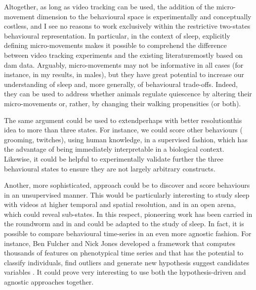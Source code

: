 Altogether, as long as video tracking can be used, the addition of the micro-movement dimension to the behavioural space is experimentally and conceptually costless, and I see no reasons to work exclusively within the restrictive two-states behavioural representation.
In particular, in the context of sleep, explicitly defining micro-movements makes it possible to comprehend the difference between video tracking experiments and the existing literature\emd{}mostly based on \gls{dam} data.
Arguably, micro-movements may not be informative in all cases (for instance, in my results, in males), 
but they have great potential to increase our understanding of sleep and, more generally, of behavioural trade-offs.
Indeed, they can be used to address whether animals regulate quiescence by altering their micro-movements or, rather, by changing their walking propensities (or both).

The same argument could be used to extend\emd{}perhaps with better resolution\emd{}this idea to more than three states.
For instance, we could score other behaviours (\eg{} grooming, twitches), using human knowledge, in a supervised fashion, which has the advantage of being immediately interpretable in a biological context. 
Likewise, it could be helpful to experimentally validate further the three behavioural states to ensure they are not largely arbitrary constructs.

Another, more sophisticated, approach could be to discover and score behaviours in an unsupervised manner\cite{berman_mapping_2014,maaten_visualizing_2008}.
This would be particularly interesting to study sleep with videos at higher temporal and spatial resolution, and in an open arena, which could reveal sub-states.
In this respect, pioneering work has been carried in the roundworm\cite{stephens_dimensionality_2008,brown_dictionary_2013} and in \droso{}\cite{berman_mapping_2014} and could be adapted to the study of sleep.
In fact, it is possible to compare behavioural time-series in an even more agnostic fashion.
For instance, Ben Fulcher and Nick Jones developed a framework that computes thousands of features on phenotypical time series and that has the potential to classify individuals, find outliers and generate new hypothesis\emd{}\ie{} suggest candidates variables
\cite{fulcher_hctsa_2017}.
It could prove very interesting to use both the hypothesis-driven and agnostic approaches together.


